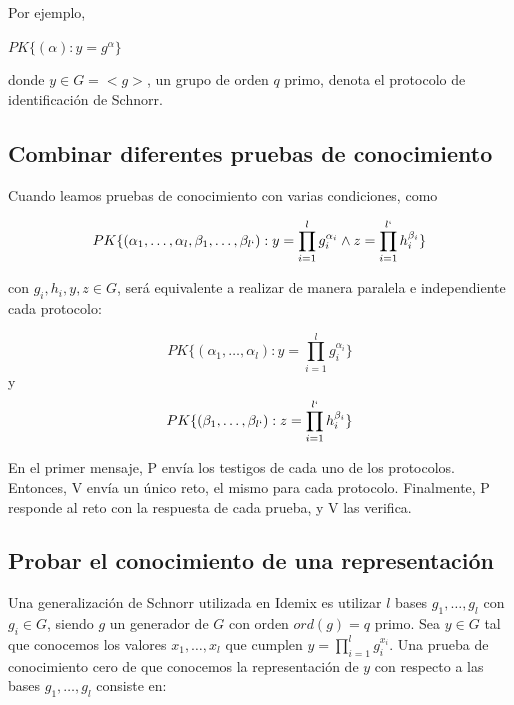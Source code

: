 \hfil

Por ejemplo,
\begin{center}
	$PK\{ (\alpha) : y=g^\alpha \}$
\end{center}
donde $y\in G = <g>$, un grupo de orden $q$ primo, denota el protocolo de identificación de Schnorr.


\subsection{Combinar diferentes pruebas de conocimiento}

Cuando leamos pruebas de conocimiento con varias condiciones, como
\begin{center}
	$$
	PK\{ (\alpha_1,\dots,\alpha_l,\beta_1,\dots,\beta_{l`}) : y=\prod_{i=1}^{l}g_i^{\alpha_i} \wedge z=\prod_{i=1}^{l`}h_i^{\beta_i} \}
	$$
\end{center}
con $g_i,h_i,y,z\in G$, será equivalente a realizar de manera paralela e independiente cada protocolo:
\begin{center}
	$$
	PK\{ (\alpha_1,\dots,\alpha_l) : y=\prod_{i=1}^{l}g_i^{\alpha_i} \}
	$$
	y
	$$
	PK\{ (\beta_1,\dots,\beta_{l`}) : z=\prod_{i=1}^{l`}h_i^{\beta_i} \}
	$$
\end{center}


En el primer mensaje, P envía los testigos de cada uno de los protocolos. Entonces, V envía un único reto, el mismo para cada protocolo. Finalmente, P responde al reto con la respuesta de cada prueba, y V las verifica.


\subsection{Probar el conocimiento de una representación}\label{reprKP}

Una generalización de Schnorr utilizada en Idemix es utilizar $l$ bases $g_1, \dots, g_l$ con $g_i \in G$, siendo $g$ un generador de $G$ con orden $ord(g)=q$ primo. Sea $y\in G$ tal que conocemos los valores $x_1,\dots,x_l$ que cumplen $y = \prod_{i=1}^{l} g_i^{x_i}$. Una prueba de conocimiento cero de que conocemos la representación de $y$ con respecto a las bases $g_1, \dots, g_l$ consiste en:


